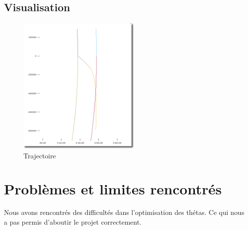 \documentclass[a4paper,20pt]{article}
\begin{document}
\subsection{Visualisation}
\begin{figure}[h!]
\centering
\includegraphics[width=6cm]{trajectoire.png}
\caption{Trajectoire}
\label{fig:1}
\end{figure}

\section{Probl\`emes et limites rencontr\'es}

Nous avons rencontrés des difficultés dans l'optimisation des thétas. Ce qui nous a pas permis d'aboutir le projet correctement.
\end{document}
